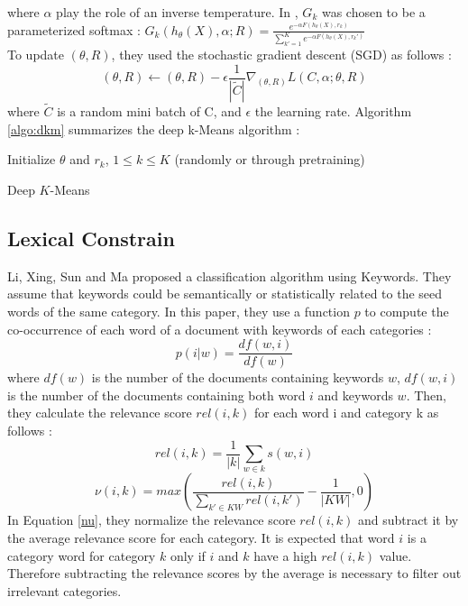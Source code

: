 where $\alpha$ play the role of an inverse temperature. In \cite{Deap-K-Means}
, $G_{k}$ was chosen to be a parameterized softmax : 
$G_{k}(h_\theta(X), \alpha; R) = \frac{e^{-\alpha F(h_\theta(X),r_k)}}
{\sum\limits_{k' = 1}^K e^{-\alpha F(h_\theta(X),r_k')}}$\\
To update $(\theta, R)$, they used the stochastic gradient descent (SGD)
as follows :
\begin{equation}
  (\theta, R) \gets (\theta, R) - \epsilon \frac{1}{|\widetilde{C}|}
  \nabla_{(\theta, R)} L(C, \alpha; \theta, R)
\end{equation}
where $\widetilde{C}$ is a random mini batch of C, and $\epsilon$ the
learning rate.
Algorithm \ref{algo:dkm} summarizes the deep k-Means algorithm :
\begin{algorithm}[!h]
  Initialize $\theta$ and $r_k$, $1 \leq k \leq K$ (randomly or through 
  pretraining)\\
  \caption{\label{algo:dkm}Deep $K$-Means}
\end{algorithm}
\subsection{\label{seq:BackLexicalConstraint}Lexical Constrain}
Li, Xing, Sun and Ma \cite{Li:2016:EDL:2983323.2983721} proposed a
classification algorithm using Keywords. They assume that keywords could be 
semantically or statistically related to the seed words of the same category.
In this paper, they
use a function $p$ to compute the co-occurrence of each word of a document
with keywords of each categories : 
\begin{equation}\label{sim}
p(i|w) = \frac{df(w,i)}{df(w)}
\end{equation}
where $df(w)$ is the number of the documents containing keywords $w$,
$df(w, i)$ is the number of the documents containing both word
$i$ and keywords $w$.
Then, they calculate the relevance score $rel(i, k)$ for each 
word i and category k as follows :
\begin{equation}\label{rel}
  rel(i,k) = \frac{1}{|k|} \sum\limits_{w \in k} s(w,i)
\end{equation}
\begin{equation}\label{nu}
  \nu(i,k) = max \left(\frac{rel(i,k)}{\sum\limits_{k' \in KW}rel(i,k')} - \frac{1}{|KW|}, 0\right)
\end{equation}
In Equation \ref{nu}, they normalize the relevance score $rel(i,k)$ and 
subtract it by the average relevance score for each category. It is
expected that word $i$ is a category word for category $k$ only if $i$ and
$k$ have a high $rel(i,k)$ value. Therefore subtracting the relevance
scores by the average is necessary to filter out irrelevant categories.